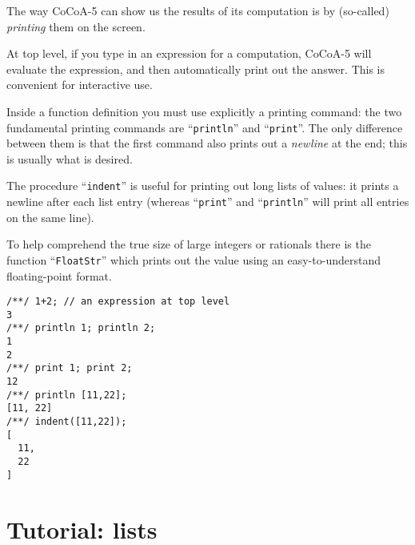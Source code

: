 \documentclass[a4paper]{mybook}
\begin{document}
        
The way CoCoA-5 can show us the results of its computation is by
(so-called) \textit{printing} them on the screen.
\par 
At top level, if you type in an expression for a computation,
CoCoA-5 will evaluate the expression, and then automatically print
out the answer.  This is convenient for interactive use.
\par 
Inside a function definition you must use explicitly a printing
command: the two fundamental printing commands are ``\verb&println&''
and ``\verb&print&''.  The only difference between them is that the
first command also prints out a \textit{newline} at the end; this is
usually what is desired.
\par 
The procedure ``\verb&indent&'' is useful for printing out long
lists of values: it prints a newline after each list entry
(whereas ``\verb&print&'' and ``\verb&println&'' will print all entries
on the same line).
\par 
To help comprehend the true size of large integers or rationals
there is the function ``\verb&FloatStr&'' which prints out the
value using an easy-to-understand floating-point format.
\begin{Verbatim}[label=example, rulecolor=\color{PineGreen}, frame=single]
/**/ 1+2; // an expression at top level
3
/**/ println 1; println 2;
1
2
/**/ print 1; print 2;
12
/**/ println [11,22];
[11, 22]
/**/ indent([11,22]);
[
  11,
  22
]
\end{Verbatim}



\section{Tutorial: lists}
\label{Tutorial: lists}
\end{document}
